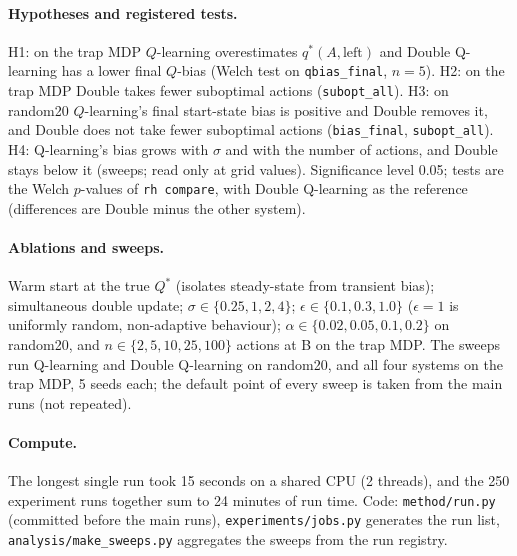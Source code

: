 \paragraph{Hypotheses and registered tests.} H1: on the trap MDP $Q$-learning overestimates $q^\ast(A,\text{left})$ and Double Q-learning has a lower final $Q$-bias (Welch test on \texttt{qbias\_final}, $n=5$). H2: on the trap MDP Double takes fewer suboptimal actions (\texttt{subopt\_all}). H3: on random20 $Q$-learning's final start-state bias is positive and Double removes it, and Double does not take fewer suboptimal actions (\texttt{bias\_final}, \texttt{subopt\_all}). H4: Q-learning's bias grows with $\sigma$ and with the number of actions, and Double stays below it (sweeps; read only at grid values). Significance level 0.05; tests are the Welch $p$-values of \texttt{rh compare}, with Double Q-learning as the reference (differences are Double minus the other system).

\paragraph{Ablations and sweeps.} Warm start at the true $Q^\ast$ (isolates steady-state from transient bias); simultaneous double update; $\sigma\in\{0.25,1,2,4\}$; $\epsilon\in\{0.1,0.3,1.0\}$ ($\epsilon=1$ is uniformly random, non-adaptive behaviour); $\alpha\in\{0.02,0.05,0.1,0.2\}$ on random20, and $n\in\{2,5,10,25,100\}$ actions at B on the trap MDP. The sweeps run Q-learning and Double Q-learning on random20, and all four systems on the trap MDP, 5 seeds each; the default point of every sweep is taken from the main runs (not repeated).

\paragraph{Compute.} The longest single run took 15 seconds on a shared CPU (2 threads), and the 250 experiment runs together sum to 24 minutes of run time. Code: \texttt{method/run.py} (committed before the main runs), \texttt{experiments/jobs.py} generates the run list, \texttt{analysis/make\_sweeps.py} aggregates the sweeps from the run registry.
